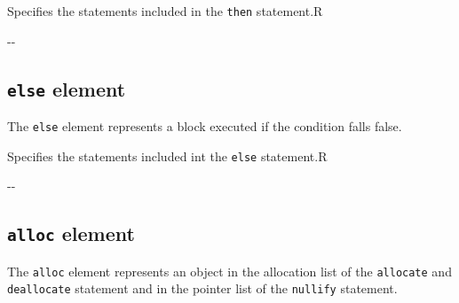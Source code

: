 
\begin{XcodeMLChildElements}
{Specifies the statements included in the {\tt then} statement.}{R}
\end{XcodeMLChildElements}

\begin{XcodeMLAttributes}
\XcodeMLAttrDef{-}{-}
{-}{-}
\end{XcodeMLAttributes}


\subsection{ {\tt else} element}

The {\tt else} element represents a block executed if the condition falls false.


\begin{XcodeMLChildElements}
{Specifies the statements included int the {\tt else} statement.}{R}
\end{XcodeMLChildElements}

\begin{XcodeMLAttributes}
\XcodeMLAttrDef{-}{-}
{-}{-}
\end{XcodeMLAttributes}


\subsection{ {\tt alloc} element}

The {\tt alloc} element represents an object in the allocation list of the {\tt allocate}
and {\tt deallocate} statement and in the pointer list of the {\tt nullify} statement.


